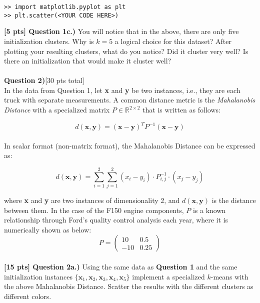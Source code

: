 \documentclass[paper=a4, fontsize=11pt]{scrartcl} %
\begin{document}
\begin{verbatim}
>> import matplotlib.pyplot as plt
>> plt.scatter(<YOUR CODE HERE>)
\end{verbatim}

\textbf{[5 pts] Question 1c.)} You will notice that in the above, there are only five initialization clusters. Why is $k=5$ a logical choice for this dataset? After plotting your resulting clusters, what do you notice? Did it cluster very well? Is there an initialization that would make it cluster well?\\
\\

{\Large \textbf{Question 2)}[30 pts total]} \\

In the data from Question 1, let \textbf{x} and \textbf{y} be two instances, i.e., they are each truck with separate measurements.  A common distance metric is the \emph{Mahalanobis Distance} with a specialized matrix $P \in \mathbb{R}^{2 \times 2}$ that is written as follows: 

\begin{equation}
d(\textbf{x}, \textbf{y}) = ( \textbf{x} - \textbf{y} )^T P^{-1} ( \textbf{x} - \textbf{y} )
\nonumber
\end{equation} \\

In scalar format (non-matrix format), the Mahalanobis Distance can be expressed as:

\begin{equation}
    d(\textbf{x}, \textbf{y}) = \sum_{i=1}^2 \sum_{j=1}^2 (x_i - y_i) \cdot P^{-1}_{i,j} \cdot (x_j - y_j)
    \nonumber
\end{equation}

where \textbf{x} and \textbf{y} are two instances of dimensionality 2, and $d(\textbf{x}, \textbf{y})$ is the distance between them. In the case of the F150 engine components, $P$ is a known relationship through Ford's quality control analysis each year, where it is numerically shown as below: \\

\begin{equation}
 P = \left(
\begin{matrix}
10 & 0.5 \\
-10 & 0.25
\end{matrix}
\right) \nonumber
\end{equation}
\\

\textbf{[15 pts] Question 2a.)} Using the same data as \textbf{Question 1} and the same initialization instances $\{\textbf{x}_1, \textbf{x}_2, \textbf{x}_3, \textbf{x}_4, \textbf{x}_5 \}$ implement a specialized $k$-means with the above Mahalanobis Distance. Scatter the results with the different clusters as different colors. \\
\end{document}
